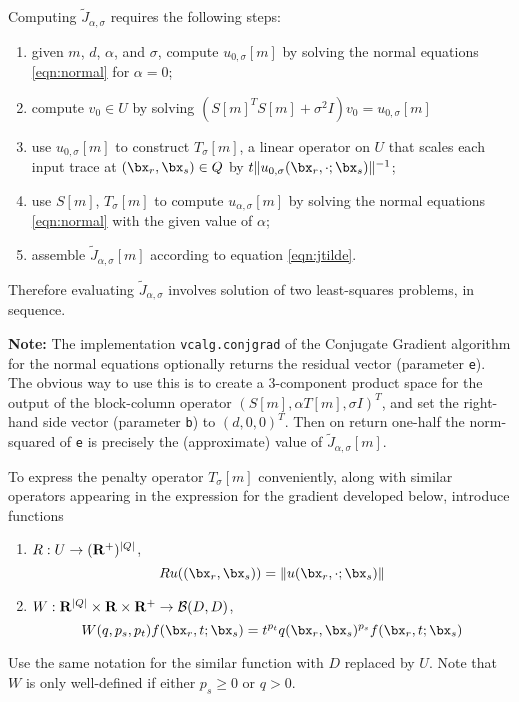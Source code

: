Computing $\tilde{J}_{\alpha,\sigma}$ requires the following steps:
\begin{enumerate}
\item given $m$, $d$, $\alpha$, and $\sigma$, compute $u_{0,\sigma}[m]$ by solving the normal equations \ref{eqn:normal} for $\alpha=0$;
\item compute $v_0 \in U$ by solving $(S[m]^TS[m] + \sigma^2 I)v_0 = u_{0,\sigma}[m]$
\item use $u_{0,\sigma}[m]$ to construct $T_{\sigma}[m]$, a linear operator on $U$  that scales each input trace at $(\bx_r,\bx_s) \in Q$  by $t\|u_{0,\sigma}(\bx_r,\cdot;\bx_s)\|^{-1}$;
\item use $S[m]$, $T_{\sigma}[m]$ to compute $u_{\alpha,\sigma}[m]$ by solving the normal equations \ref{eqn:normal} with the given value of $\alpha$;
\item assemble $\tilde{J}_{\alpha,\sigma}[m]$ according to equation \ref{eqn:jtilde}.
\end{enumerate}

Therefore evaluating $\tilde{J}_{\alpha,\sigma}$ involves solution of
two least-squares problems, in sequence.

{\bf Note:} The implementation {\tt vcalg.conjgrad} of the Conjugate Gradient algorithm for the normal equations optionally returns the residual vector (parameter {\tt e}). The obvious way to use this is to create a 3-component product space for the output of the block-column operator $(S[m],\alpha T[m], \sigma I)^T$, and set the right-hand side vector (parameter {\tt b})
to $(d,0,0)^T$. Then on return one-half the norm-squared of {\tt e} is precisely the (approximate) value of $\tilde{J}_{\alpha,\sigma}[m]$.

To express the penalty operator $T_{\sigma}[m]$ conveniently, along
with similar operators appearing in the expression for the gradient
developed below, introduce functions
\begin{enumerate}
\item $R: U \rightarrow ({\bf R}^{+})^{|Q|}$,
  \[
    Ru((\bx_r,\bx_s)) = \|u(\bx_r, \cdot;\bx_s)\|
  \]
\item $W: {\bf R}^{|Q|} \times {\bf R} \times {\bf R}^{+}
  \rightarrow {\cal B}(D,D)$,
  \[
    W(q,p_s, p_t)f (\bx_r,t;\bx_s) = t^{p_t}
    q(\bx_r,\bx_s)^{p_s}f(\bx_r,t;\bx_s)
  \]
\end{enumerate}
Use the same notation for the similar function with $D$ replaced by
$U$. Note that $W$ is only well-defined if either $p_s \ge 0$ or $q>0$.

